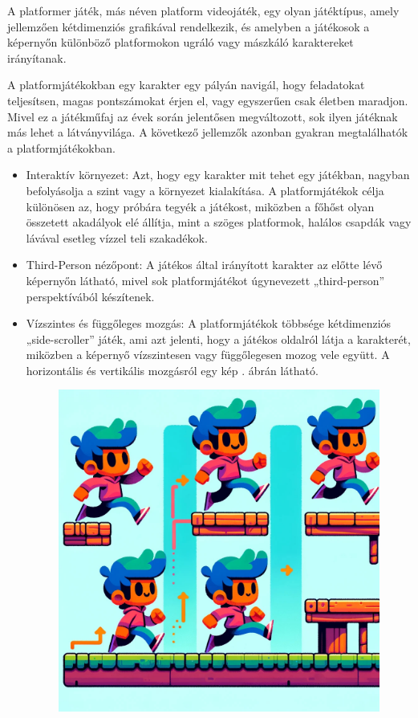 
A platformer játék, más néven platform videojáték, egy olyan játéktípus, amely jellemzően kétdimenziós grafikával rendelkezik, és amelyben a játékosok a képernyőn különböző platformokon ugráló vagy mászkáló karaktereket irányítanak.

A platformjátékokban egy karakter egy pályán navigál, hogy feladatokat teljesítsen, magas pontszámokat érjen el, vagy egyszerűen csak életben maradjon. Mivel ez a játékműfaj az évek során jelentősen megváltozott, sok ilyen játéknak más lehet a látványvilága. A következő jellemzők azonban gyakran megtalálhatók a platformjátékokban.\cite{platformerfeature}
\begin{itemize}
\item Interaktív környezet: Azt, hogy egy karakter mit tehet egy játékban, nagyban befolyásolja a szint vagy a környezet kialakítása. A platformjátékok célja különösen az, hogy próbára tegyék a játékost, miközben a főhőst olyan összetett akadályok elé állítja, mint a szöges platformok, halálos csapdák vagy lávával esetleg vízzel teli szakadékok.\cite{platformerfeature}
\item Third-Person nézőpont: A játékos által irányított karakter az előtte lévő képernyőn látható, mivel sok platformjátékot úgynevezett „third-person” perspektívából készítenek.\cite{platformerfeature}
\item Vízszintes és függőleges mozgás: A platformjátékok többsége kétdimenziós „side-scroller” játék, ami azt jelenti, hogy a játékos oldalról látja a karakterét, miközben a képernyő vízszintesen vagy függőlegesen mozog vele együtt.\cite{platformerfeature} A horizontális és vertikális mozgásról egy kép . ábrán látható.
\begin{figure}[ht]
\centering
\includegraphics[scale = 0.3]{images/vertical_and_horizontal_movement.jpg}

\end{figure}
\end{itemize}

